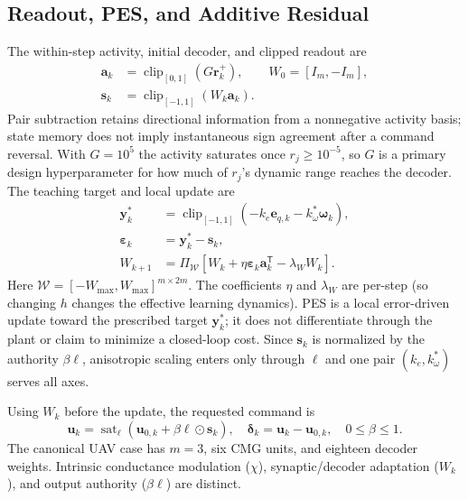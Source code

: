 \documentclass[letterpaper, 10 pt, conference]{ieeeconf}
\newcommand{\T}{^{\mathsf T}}
\newcommand{\sat}{\operatorname{sat}}
\newcommand{\clip}{\operatorname{clip}}
\begin{document}
\subsection{Readout, PES, and Additive Residual}
The within-step activity, initial decoder, and clipped readout are
\begin{equation}
 \begin{aligned}
 \bm a_k&=\clip_{[0,1]}(G\bm r_k^+),\qquad W_0=[I_m,-I_m],\\
 \bm s_k&=\clip_{[-1,1]}(W_k\bm a_k).
 \end{aligned}
 \label{eq:readout}
\end{equation}
Pair subtraction retains directional information from a nonnegative
activity basis; state memory does not imply instantaneous sign agreement
after a command reversal. With $G=10^5$ the activity saturates once
$r_j\ge10^{-5}$, so $G$ is a primary design hyperparameter for how much of
$r_j$'s dynamic range reaches the decoder. The teaching target and local update are
\begin{align}
 \bm y_k^*&=\clip_{[-1,1]}(-k_e\bm e_{q,k}-k_\omega^*\bm\omega_k),\\
 \bm\varepsilon_k&=\bm y_k^*-\bm s_k,\\
 W_{k+1}&=\Pi_{\mathcal W}
       [W_k+\eta\bm\varepsilon_k\bm a_k\T-\lambda_W W_k].
 \label{eq:pes}
\end{align}
Here $\mathcal W=[-W_{\max},W_{\max}]^{m\times2m}$. The coefficients $\eta$ and $\lambda_W$ are per-step (so changing $h$ changes the effective learning dynamics). PES is a local error-driven update toward the prescribed target $\bm y_k^*$; it does not differentiate through the plant or claim to minimize a closed-loop cost. Since $\bm s_k$ is normalized by the authority $\beta\bm\ell$, anisotropic scaling enters only through $\bm\ell$ and one pair $(k_e,k_\omega^*)$ serves all axes.

Using $W_k$ before the update, the requested command is
\begin{equation}
 \bm u_k=\sat_{\bm\ell}(\bm u_{0,k}+\beta\bm\ell\odot\bm s_k),\quad
 \bm\delta_k=\bm u_k-\bm u_{0,k},\quad 0\le\beta\le1.
 \label{eq:residual}
\end{equation}
The canonical UAV case has $m=3$, six CMG units, and eighteen decoder
weights. Intrinsic conductance modulation ($\chi$), synaptic/decoder
adaptation ($W_k$), and output authority ($\beta\bm\ell$) are distinct.
\end{document}
